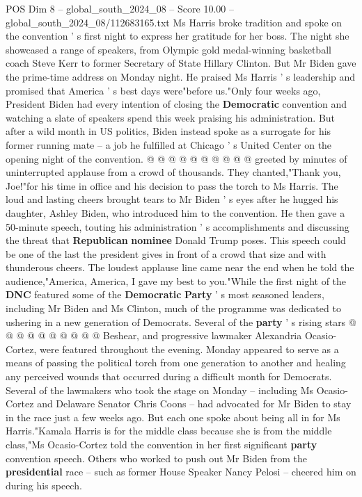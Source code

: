 \begin{textsample}{POS Dim 8 – global\_south\_2024\_08 – Score 10.00 – global\_south\_2024\_08/112683165.txt}
Ms Harris broke tradition and spoke on the convention ' s first night to express her gratitude for her boss.
The night she showcased a range of speakers, from Olympic gold medal-winning basketball coach Steve Kerr to former Secretary of State Hillary Clinton.
But Mr Biden gave the prime-time address on Monday night.
He praised Ms Harris ' s leadership and promised that America ' s best days were"before us."Only four weeks ago, President Biden had every intention of closing the \textbf{Democratic} convention and watching a slate of speakers spend this week praising his administration.
But after a wild month in US politics, Biden instead spoke as a surrogate for his former running mate -- a job he fulfilled at Chicago ' s United Center on the opening night of the convention. @ @ @ @ @ @ @ @ @ @ greeted by minutes of uninterrupted applause from a crowd of thousands.
They chanted,"Thank you, Joe!"for his time in office and his decision to pass the torch to Ms Harris.
The loud and lasting cheers brought tears to Mr Biden ' s eyes after he hugged his daughter, Ashley Biden, who introduced him to the convention.
He then gave a 50-minute speech, touting his administration ' s accomplishments and discussing the threat that \textbf{Republican} \textbf{nominee} Donald Trump poses.
This speech could be one of the last the president gives in front of a crowd that size and with thunderous cheers.
The loudest applause line came near the end when he told the audience,"America, America, I gave my best to you."While the first night of the \textbf{DNC} featured some of the \textbf{Democratic} \textbf{Party} ' s most seasoned leaders, including Mr Biden and Ms Clinton, much of the programme was dedicated to ushering in a new generation of Democrats.
Several of the \textbf{party} ' s rising stars @ @ @ @ @ @ @ @ @ @ Beshear, and progressive lawmaker Alexandria Ocasio-Cortez, were featured throughout the evening.
Monday appeared to serve as a means of passing the political torch from one generation to another and healing any perceived wounds that occurred during a difficult month for Democrats.
Several of the lawmakers who took the stage on Monday -- including Ms Ocasio-Cortez and Delaware Senator Chris Coons -- had advocated for Mr Biden to stay in the race just a few weeks ago.
But each one spoke about being all in for Ms Harris."Kamala Harris is for the middle class because she is from the middle class,"Ms Ocasio-Cortez told the convention in her first significant \textbf{party} convention speech.
Others who worked to push out Mr Biden from the \textbf{presidential} race -- such as former House Speaker Nancy Pelosi -- cheered him on during his speech.

\end{textsample}
